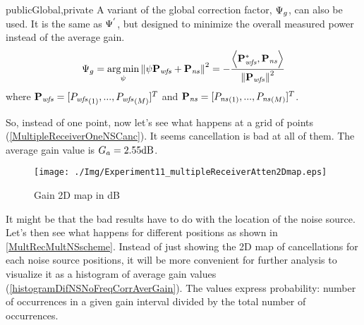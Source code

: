 \begin{shownto}{publicGlobal,private}	
A variant of the global correction factor, $\globalCorrectionFactor$, can also be used. It is the same as $\globalCorrectionFactorAverGain$, but designed to minimize the overall measured power instead of the average gain.
	\begin{equation}
	\globalCorrectionFactor = \argmin_{\psi} \norm{\psi \Field[wfs][frequency][vector] + \Field[ns][frequency][vector]}^2 = -\frac{\scalarProd{\Field[wfs][frequency][vector]^*}{\Field[ns][frequency][vector]}}{\norm{\Field[wfs][frequency][vector]}^2}
	\end{equation}
	where $\Field[wfs][frequency][vector] = [\Field[wfs][frequency][scalar][1],...,\Field[wfs][frequency][scalar][\numMeasPoints]]^T$ and $\Field[ns][frequency][vector] = [\Field[ns][frequency][scalar][1],...,\Field[ns][frequency][scalar][\numMeasPoints]]^T$.
\end{shownto}

So, instead of one point, now let's see what happens at a grid of points (\autoref{MultipleReceiverOneNSCanc}). It seems cancellation is bad at all of them.  The average gain value is $\averageGain = 2.55 \si{dB}$.

\begin{figure}
	\centering			\texttt{[image: ./Img/Experiment11\_multipleReceiverAtten2Dmap.eps]}
	\caption[Gain 2D map]{Gain 2D map in dB}
	\label{MultipleReceiverOneNSCanc}
\end{figure}

It might be that the bad results have to do with the location of the noise source. Let's then see what happens for different positions as shown in \autoref{MultRecMultNSscheme}. Instead of just showing the 2D map of cancellations for each noise source positions, it will be more convenient for further analysis to visualize it as a histogram of 
average gain values (\autoref{histogramDifNSNoFreqCorrAverGain}). The values express probability: number of occurrences in a given gain interval divided by the total number of occurrences.

